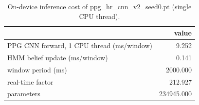 \begin{table}
\caption{On-device inference cost of ppg_hr_cnn_v2_seed0.pt (single CPU thread).}
\label{tab:live_inference_latency}
\begin{tabular}{lr}
\toprule
 & value \\
\midrule
PPG CNN forward, 1 CPU thread (ms/window) & 9.252 \\
HMM belief update (ms/window) & 0.141 \\
window period (ms) & 2000.000 \\
real-time factor & 212.927 \\
parameters & 234945.000 \\
\bottomrule
\end{tabular}
\end{table}
